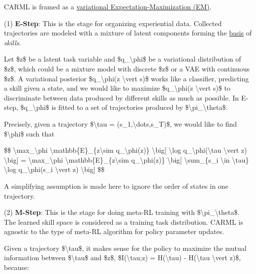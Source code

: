 CARML is framed as a \href{https://chrischoy.github.io/research/Expectation-Maximization-and-Variational-Inference/}{variational Expectation-Maximization (EM)}.

(1) \textbf{E-Step}: This is the stage for organizing experiential data. Collected trajectories are modeled with a mixture of latent components forming the \href{https://en.wikipedia.org/wiki/Basis_(linear_algebra)}{basis} of \emph{skills}.

Let \$z\$ be a latent task variable and \$q\_\textbackslash phi\$ be a variational distribution of \$z\$, which could be a mixture model with discrete \$z\$ or a VAE with continuous \$z\$. A variational posterior \$q\_\textbackslash phi(z \textbackslash vert s)\$ works like a classifier, predicting a skill given a state, and we would like to maximize \$q\_\textbackslash phi(z \textbackslash vert s)\$ to discriminate between data produced by different skills as much as possible. In E-step, \$q\_\textbackslash phi\$ is fitted to a set of trajectories produced by \$\textbackslash pi\_\textbackslash theta\$.

Precisely, given a trajectory \$\textbackslash tau = (s\_1,\textbackslash dots,s\_T)\$, we would like to find \$\textbackslash phi\$ such that

\$\$ \textbackslash max\_\textbackslash phi \textbackslash mathbb\{E\}\_\{z\textbackslash sim q\_\textbackslash phi(z)\} \textbackslash big{[} \textbackslash log q\_\textbackslash phi(\textbackslash tau \textbackslash vert z) \textbackslash big{]} = \textbackslash max\_\textbackslash phi \textbackslash mathbb\{E\}\_\{z\textbackslash sim q\_\textbackslash phi(z)\} \textbackslash big{[} \textbackslash sum\_\{s\_i \textbackslash in \textbackslash tau\} \textbackslash log q\_\textbackslash phi(s\_i \textbackslash vert z) \textbackslash big{]} \$\$

A simplifying assumption is made here to ignore the order of states in one trajectory.

(2) \textbf{M-Step}: This is the stage for doing meta-RL training with \$\textbackslash pi\_\textbackslash theta\$. The learned skill space is considered as a training task distribution. CARML is agnostic to the type of meta-RL algorithm for policy parameter updates.

Given a trajectory \$\textbackslash tau\$, it makes sense for the policy to maximize the mutual information between \$\textbackslash tau\$ and \$z\$, \$I(\textbackslash tau;z) = H(\textbackslash tau) - H(\textbackslash tau \textbackslash vert z)\$, because:

